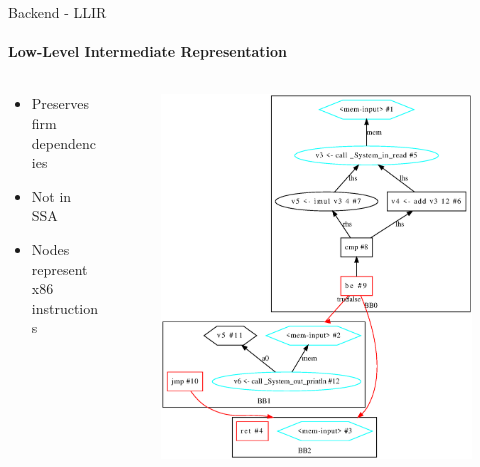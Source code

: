 \documentclass[en,16:9]{sdqbeamer}
\begin{document}
\begin{frame}{Backend - LLIR}
	\framesubtitle{Low-Level Intermediate Representation}
	
	\begin{columns}
		\begin{column}{0.35\textwidth}
			\begin{itemize}
				\item Preserves firm dependencies
				\item Not in SSA
				\item Nodes represent x86 instructions
			\end{itemize}
		\end{column}

		\begin{column}{0.65\textwidth}
			\vspace{-3em}
			\begin{figure}
				\centering
				\includegraphics[scale=0.26]{images/llir-example}
			\end{figure}
		\end{column}
	\end{columns}
\end{frame}
\end{document}
